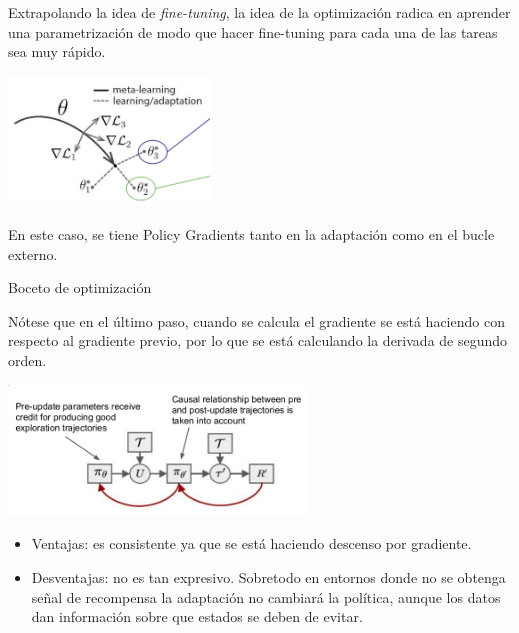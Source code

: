 Extrapolando la idea de \textit{fine-tuning}, la idea de la optimización radica en aprender
una parametrización de modo que hacer fine-tuning para cada una de las tareas sea muy
rápido.

\begin{center}
\includegraphics[width=0.4\textwidth]{figures/2020-07-25-180726_438x284_scrot.png}
\end{center}

En este caso, se tiene Policy Gradients tanto en la adaptación como en el bucle externo.

\begin{algorithm}
    \caption{Boceto de optimización}
\end{algorithm}

Nótese que en el último paso, cuando se calcula el gradiente se está haciendo con
respecto al gradiente previo, por lo que se está calculando la derivada de segundo orden.

\begin{center}
\includegraphics[width=0.6\textwidth]{figures/2020-07-25-183028_678x294_scrot.png}
\end{center}

\begin{itemize}
    \item Ventajas: es consistente ya que se está haciendo descenso por gradiente.
    \item Desventajas: no es tan expresivo. Sobretodo en entornos donde no se obtenga señal de recompensa
        la adaptación no cambiará la política, aunque los datos dan información sobre
        que estados se deben de evitar.
\end{itemize}

